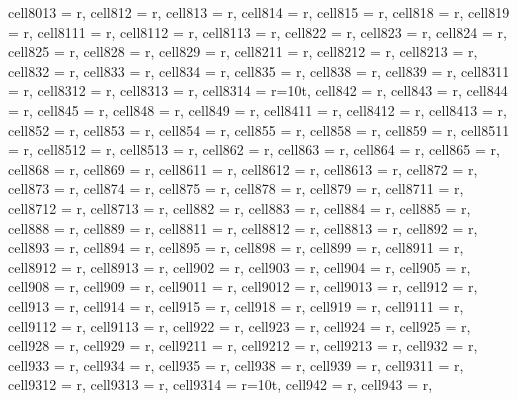 \begin{landscape}
\begin{longtblr}[
  caption = {Changes in average values and effects differences significance from post hoc analysis.},
  label = {tab:appendix_LCBM_all_results_post_hocs}
]
{  cell{80}{13} = {r},
  cell{81}{2} = {r},
  cell{81}{3} = {r},
  cell{81}{4} = {r},
  cell{81}{5} = {r},
  cell{81}{8} = {r},
  cell{81}{9} = {r},
  cell{81}{11} = {r},
  cell{81}{12} = {r},
  cell{81}{13} = {r},
  cell{82}{2} = {r},
  cell{82}{3} = {r},
  cell{82}{4} = {r},
  cell{82}{5} = {r},
  cell{82}{8} = {r},
  cell{82}{9} = {r},
  cell{82}{11} = {r},
  cell{82}{12} = {r},
  cell{82}{13} = {r},
  cell{83}{2} = {r},
  cell{83}{3} = {r},
  cell{83}{4} = {r},
  cell{83}{5} = {r},
  cell{83}{8} = {r},
  cell{83}{9} = {r},
  cell{83}{11} = {r},
  cell{83}{12} = {r},
  cell{83}{13} = {r},
  cell{83}{14} = {r=10}{t},
  cell{84}{2} = {r},
  cell{84}{3} = {r},
  cell{84}{4} = {r},
  cell{84}{5} = {r},
  cell{84}{8} = {r},
  cell{84}{9} = {r},
  cell{84}{11} = {r},
  cell{84}{12} = {r},
  cell{84}{13} = {r},
  cell{85}{2} = {r},
  cell{85}{3} = {r},
  cell{85}{4} = {r},
  cell{85}{5} = {r},
  cell{85}{8} = {r},
  cell{85}{9} = {r},
  cell{85}{11} = {r},
  cell{85}{12} = {r},
  cell{85}{13} = {r},
  cell{86}{2} = {r},
  cell{86}{3} = {r},
  cell{86}{4} = {r},
  cell{86}{5} = {r},
  cell{86}{8} = {r},
  cell{86}{9} = {r},
  cell{86}{11} = {r},
  cell{86}{12} = {r},
  cell{86}{13} = {r},
  cell{87}{2} = {r},
  cell{87}{3} = {r},
  cell{87}{4} = {r},
  cell{87}{5} = {r},
  cell{87}{8} = {r},
  cell{87}{9} = {r},
  cell{87}{11} = {r},
  cell{87}{12} = {r},
  cell{87}{13} = {r},
  cell{88}{2} = {r},
  cell{88}{3} = {r},
  cell{88}{4} = {r},
  cell{88}{5} = {r},
  cell{88}{8} = {r},
  cell{88}{9} = {r},
  cell{88}{11} = {r},
  cell{88}{12} = {r},
  cell{88}{13} = {r},
  cell{89}{2} = {r},
  cell{89}{3} = {r},
  cell{89}{4} = {r},
  cell{89}{5} = {r},
  cell{89}{8} = {r},
  cell{89}{9} = {r},
  cell{89}{11} = {r},
  cell{89}{12} = {r},
  cell{89}{13} = {r},
  cell{90}{2} = {r},
  cell{90}{3} = {r},
  cell{90}{4} = {r},
  cell{90}{5} = {r},
  cell{90}{8} = {r},
  cell{90}{9} = {r},
  cell{90}{11} = {r},
  cell{90}{12} = {r},
  cell{90}{13} = {r},
  cell{91}{2} = {r},
  cell{91}{3} = {r},
  cell{91}{4} = {r},
  cell{91}{5} = {r},
  cell{91}{8} = {r},
  cell{91}{9} = {r},
  cell{91}{11} = {r},
  cell{91}{12} = {r},
  cell{91}{13} = {r},
  cell{92}{2} = {r},
  cell{92}{3} = {r},
  cell{92}{4} = {r},
  cell{92}{5} = {r},
  cell{92}{8} = {r},
  cell{92}{9} = {r},
  cell{92}{11} = {r},
  cell{92}{12} = {r},
  cell{92}{13} = {r},
  cell{93}{2} = {r},
  cell{93}{3} = {r},
  cell{93}{4} = {r},
  cell{93}{5} = {r},
  cell{93}{8} = {r},
  cell{93}{9} = {r},
  cell{93}{11} = {r},
  cell{93}{12} = {r},
  cell{93}{13} = {r},
  cell{93}{14} = {r=10}{t},
  cell{94}{2} = {r},
  cell{94}{3} = {r},
}
\end{longtblr}
\end{landscape}
